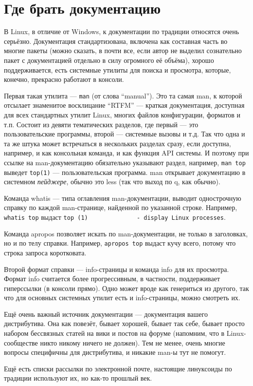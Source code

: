 \documentclass{../../text-style}
\begin{document}
\section{Где брать документацию}

В Linux, в отличие от Windows, к документации по традиции относятся очень серьёзно.
Документация стандартизована, включена как составная часть во многие пакеты (можно сказать, в почти все, если автор не выделил сознательно пакет с документацией отдельно в силу огромного её объёма), хорошо поддерживается, есть системные утилиты для поиска и просмотра, которые, конечно, прекрасно работают в консоли.

Первая такая утилита --- \verb|man| (от слова \enquote{manual}).
Это та самая man, к которой отсылает знаменитое восклицание \enquote{RTFM} --- краткая документация, доступная для всех стандартных утилит Linux, многих файлов конфигурации, форматов и т.п.
Состоит из девяти тематических разделов, где первый --- это пользовательские программы, второй --- системные вызовы и т.д.
Так что одна и та же штука может встречаться в нескольких разделах сразу, если доступна, например, и как консольная команда, и как функция API системы.
И поэтому при ссылке на man-документацию обязательно указывают раздел, например, \verb|man top| выведет \verb|top(1)| --- пользовательская программа.
man открывает документацию в системном \emph{пейджере}, обычно это less (так что выход по q, как обычно).

Команда whatis --- типа оглавления man-документации, выводит однострочную справку по каждой man-странице, найденной по указанной строке.
Например, \verb|whatis top| выдаст \verb|top (1)              - display Linux processes|.

Команда apropos позволяет искать по man-документации, не только в заголовках, но и по телу справки.
Например, \verb|apropos top| выдаст кучу всего, потому что строка запроса коротковата.

Второй формат справки --- info-страницы и команда info для их просмотра.
Формат info считается более прогрессивным, в частности, поддерживает гиперссылки (в консоли прямо).
Одно может вроде как генериться из другого, так что для основных системных утилит есть и info-страницы, можно смотреть их.

Ещё очень важный источник документации --- документация вашего дистрибутива.
Она как повезёт, бывает хорошей, бывает так себе, бывает просто набором бессвязных статей на вики и постов на форуме (напомним, что в Linux-сообществе никто никому ничего не должен).
Тем не менее, очень многие вопросы специфичны для дистрибутива, и никакие man-ы тут не помогут.

Ещё есть списки рассылки по электронной почте, настоящие линуксоиды по традиции используют их, но как-то прошлый век.
\end{document}
